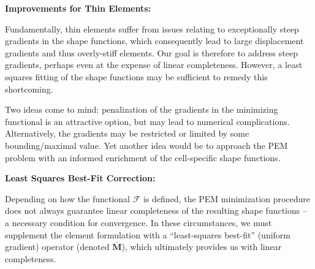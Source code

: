 \documentclass[11pt]{article} %
\begin{document}
\begin{center}
\textbf{Improvements for Thin Elements:}
\end{center}

Fundamentally, thin elements suffer from issues relating to exceptionally steep gradients in the shape functions, which consequently lead to large displacement gradients and thus overly-stiff elements. Our goal is therefore to address steep gradients, perhaps even at the expense of linear completeness. However, a least squares fitting of the shape functions may be sufficient to remedy this shortcoming.

Two ideas come to mind: penalization of the gradients in the minimizing functional is an attractive option, but may lead to numerical complications. Alternatively, the gradients may be restricted or limited by some bounding/maximal value. Yet another idea would be to approach the PEM problem with an informed enrichment of the cell-specific shape functions.

\begin{center}
\textbf{Least Squares Best-Fit Correction:}
\end{center}

Depending on how the functional $\mathcal{F}$ is defined, the PEM minimization procedure does not always guarantee linear completeness of the resulting shape functions -- a necessary condition for convergence. In these circumstances, we must supplement the element formulation with a ``least-squares best-fit'' (uniform gradient) operator (denoted $\bar{\mathbf{M}}$), which ultimately provides us with linear completeness.
\end{document}
